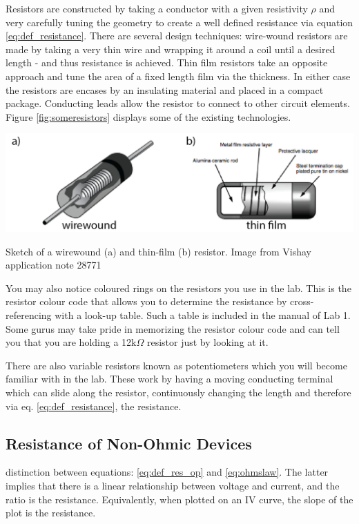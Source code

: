 \documentclass{tufte-book}
\begin{document}
Resistors are constructed by taking a conductor with a given resistivity $\rho$ and very carefully tuning the geometry to create a well defined resistance via equation \ref{eq:def_resistance}. There are several design techniques: wire-wound resistors are made by taking a very thin wire and wrapping it around a coil until a desired length - and thus resistance is achieved. Thin film resistors take an opposite approach and tune the area of a fixed length film via the thickness. In either case the resistors are encases by an insulating material and placed in a compact package. Conducting leads allow the resistor to connect to other circuit elements. Figure \ref{fig:someresistors} displays some of the existing technologies.

\begin{marginfigure}%
  \includegraphics[width=\linewidth]{someresistors}
\caption{Sketch of a wirewound (a) and thin-film (b) resistor. Image from Vishay application note 28771}
  \label{fig:someresistors}
\end{marginfigure}

You may also notice coloured rings on the resistors you use in the lab. This is the resistor colour code that allows you to determine the resistance by cross-referencing with a look-up table. Such a table is included in the manual of Lab 1.  Some gurus may take pride in memorizing the resistor colour code and can tell you that you are holding a 12k$\Omega$ resistor just by looking at it.

There are also variable resistors known as potentiometers which you will become familiar with in the lab. These work by having a moving conducting terminal which can slide along the resistor, continuously changing the length and therefore via eq. \ref{eq:def_resistance}, the resistance.


\subsection{Resistance of Non-Ohmic Devices}
 distinction between equations: \ref{eq:def_res_op} and \ref{eq:ohmslaw}. The latter implies that there is a linear relationship between voltage and current, and the ratio is the resistance. Equivalently, when plotted on an IV curve, the slope of the plot is the resistance.
\end{document}
